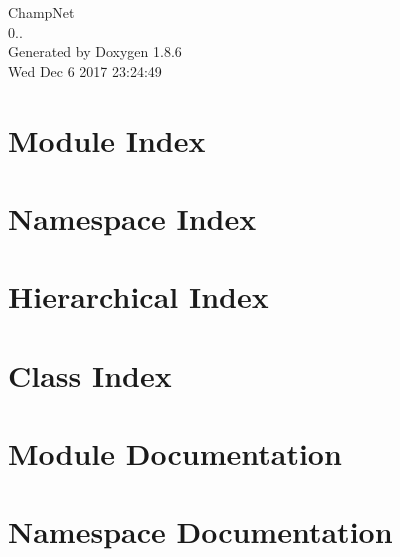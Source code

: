 \documentclass[twoside]{book}
\newcommand{\clearemptydoublepage}{%
  \newpage{\pagestyle{empty}\cleardoublepage}%
}
\begin{document}
\hypersetup{pageanchor=false}
\begin{titlepage}
\vspace*{7cm}
\begin{center}%
{\Large Champ\-Net \\[1ex]\large 0.. }\\
\vspace*{1cm}
{\large Generated by Doxygen 1.8.6}\\
\vspace*{0.5cm}
{\small Wed Dec 6 2017 23:24:49}\\
\end{center}
\end{titlepage}
\clearemptydoublepage
\tableofcontents
\clearemptydoublepage
{}
\hypersetup{pageanchor=true}

\chapter{Module Index}

\chapter{Namespace Index}

\chapter{Hierarchical Index}

\chapter{Class Index}

\chapter{Module Documentation}




\chapter{Namespace Documentation}


\end{document}
